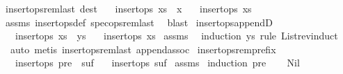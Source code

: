 \begin{isabellebody}
\endisatagproof
{\isafoldproof}%
%
\isadelimproof
\isanewline
%
\endisadelimproof
\isanewline
{}\isamarkupfalse%
\ insert{\isacharunderscore}ops{\isacharunderscore}rem{\isacharunderscore}last\ {\isacharbrackleft}dest{\isacharbrackright}{\isacharcolon}\isanewline
\ \ \ {\isachardoublequoteopen}insert{\isacharunderscore}ops\ {\isacharparenleft}xs\ {\isacharat}\ {\isacharbrackleft}x{\isacharbrackright}{\isacharparenright}{\isachardoublequoteclose}\isanewline
\ \ \ {\isachardoublequoteopen}insert{\isacharunderscore}ops\ xs{\isachardoublequoteclose}\isanewline
%
\isadelimproof
%
\endisadelimproof
%
\isatagproof
{}\isamarkupfalse%
\ assms\ insert{\isacharunderscore}ops{\isacharunderscore}def\ spec{\isacharunderscore}ops{\isacharunderscore}rem{\isacharunderscore}last\ \isamarkupfalse%
\ blast%
\endisatagproof
{\isafoldproof}%
%
\isadelimproof
\isanewline
%
\endisadelimproof
\isanewline
{}\isamarkupfalse%
\ insert{\isacharunderscore}ops{\isacharunderscore}appendD{\isacharcolon}\isanewline
\ \ \ {\isachardoublequoteopen}insert{\isacharunderscore}ops\ {\isacharparenleft}xs\ {\isacharat}\ ys{\isacharparenright}{\isachardoublequoteclose}\isanewline
\ \ \ {\isachardoublequoteopen}insert{\isacharunderscore}ops\ xs{\isachardoublequoteclose}\isanewline
%
\isadelimproof
%
\endisadelimproof
%
\isatagproof
{}\isamarkupfalse%
\ assms\ \isamarkupfalse%
\ {\isacharparenleft}induction\ ys\ rule{\isacharcolon}\ List{\isachardot}rev{\isacharunderscore}induct{\isacharcomma}\isanewline
\ \ auto{\isacharcomma}\ metis\ insert{\isacharunderscore}ops{\isacharunderscore}rem{\isacharunderscore}last\ append{\isacharunderscore}assoc{\isacharparenright}%
\endisatagproof
{\isafoldproof}%
%
\isadelimproof
\isanewline
%
\endisadelimproof
\isanewline
{}\isamarkupfalse%
\ insert{\isacharunderscore}ops{\isacharunderscore}rem{\isacharunderscore}prefix{\isacharcolon}\isanewline
\ \ \ {\isachardoublequoteopen}insert{\isacharunderscore}ops\ {\isacharparenleft}pre\ {\isacharat}\ suf{\isacharparenright}{\isachardoublequoteclose}\isanewline
\ \ \ {\isachardoublequoteopen}insert{\isacharunderscore}ops\ suf{\isachardoublequoteclose}\isanewline
%
\isadelimproof
%
\endisadelimproof
%
\isatagproof
{}\isamarkupfalse%
\ assms\ \isamarkupfalse%
{\isacharparenleft}induction\ pre{\isacharparenright}\isanewline
\ \ \isamarkupfalse%
\ Nil\isanewline

\end{isabellebody}
